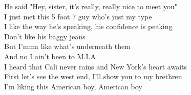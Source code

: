 He said "Hey, sister, it's really, really nice to meet you" \\
I just met this 5 foot 7 guy who's just my type \\
I like the way he's speaking, his confidence is peaking \\
Don't like his baggy jeans \\
But I'mma like what's underneath them \\

And no I ain't been to M.I.A \\
I heard that Cali never rains and New York's heart awaits \\
First let's see the west end, I'll show you to my brethren \\
I'm liking this American boy, American boy \\

